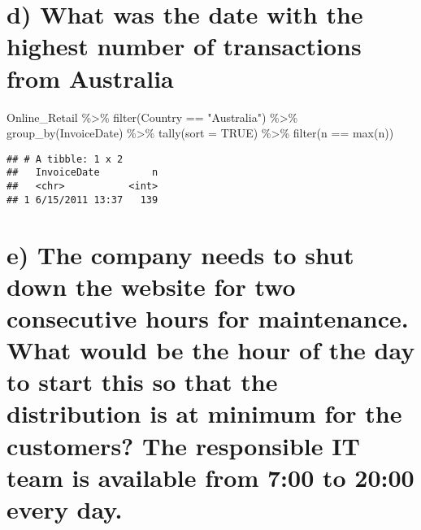 \documentclass[
]{article}
\newenvironment{Shaded}{\begin{snugshade}}{\end{snugshade}}
\newcommand{\AttributeTok}[1]{\textcolor[rgb]{0.77,0.63,0.00}{#1}}
\newcommand{\ConstantTok}[1]{\textcolor[rgb]{0.00,0.00,0.00}{#1}}
\newcommand{\FunctionTok}[1]{\textcolor[rgb]{0.00,0.00,0.00}{#1}}
\newcommand{\NormalTok}[1]{#1}
\newcommand{\SpecialCharTok}[1]{\textcolor[rgb]{0.00,0.00,0.00}{#1}}
\newcommand{\StringTok}[1]{\textcolor[rgb]{0.31,0.60,0.02}{#1}}
\begin{document}
\hypertarget{d-what-was-the-date-with-the-highest-number-of-transactions-from-australia}{%
\section{d) What was the date with the highest number of transactions
from
Australia}\label{d-what-was-the-date-with-the-highest-number-of-transactions-from-australia}}

\begin{Shaded}
\begin{Highlighting}[]
\NormalTok{Online\_Retail }\SpecialCharTok{\%\textgreater{}\%} 
  \FunctionTok{filter}\NormalTok{(Country }\SpecialCharTok{==} \StringTok{"Australia"}\NormalTok{) }\SpecialCharTok{\%\textgreater{}\%} 
  \FunctionTok{group\_by}\NormalTok{(InvoiceDate) }\SpecialCharTok{\%\textgreater{}\%} 
  \FunctionTok{tally}\NormalTok{(}\AttributeTok{sort =} \ConstantTok{TRUE}\NormalTok{) }\SpecialCharTok{\%\textgreater{}\%} 
  \FunctionTok{filter}\NormalTok{(n }\SpecialCharTok{==} \FunctionTok{max}\NormalTok{(n))}
\end{Highlighting}
\end{Shaded}

\begin{verbatim}
## # A tibble: 1 x 2
##   InvoiceDate         n
##   <chr>           <int>
## 1 6/15/2011 13:37   139
\end{verbatim}

\hypertarget{e-the-company-needs-to-shut-down-the-website-for-two-consecutive-hours-for-maintenance.-what-would-be-the-hour-of-the-day-to-start-this-so-that-the-distribution-is-at-minimum-for-the-customers-the-responsible-it-team-is-available-from-700-to-2000-every-day.}{%
\section{e) The company needs to shut down the website for two
consecutive hours for maintenance. What would be the hour of the day to
start this so that the distribution is at minimum for the customers? The
responsible IT team is available from 7:00 to 20:00 every
day.}\label{e-the-company-needs-to-shut-down-the-website-for-two-consecutive-hours-for-maintenance.-what-would-be-the-hour-of-the-day-to-start-this-so-that-the-distribution-is-at-minimum-for-the-customers-the-responsible-it-team-is-available-from-700-to-2000-every-day.}}
\end{document}
